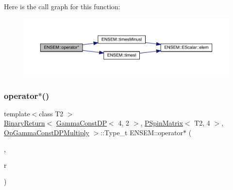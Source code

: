 Here is the call graph for this function\+:\nopagebreak
\begin{figure}[H]
\begin{center}
\leavevmode
\includegraphics[width=350pt]{d6/df5/group__primspinmatrix_gaa16aa59946d908b7254dc099e2518fc0_cgraph}
\end{center}
\end{figure}
\mbox{\label{group__primspinmatrix_gaa8e0559c55ac9cff30b9407943afea03}} 
\subsubsection{\texorpdfstring{operator$\ast$()}{operator*()}\hspace{0.1cm}{\footnotesize\ttfamily [35/64]}}
{\footnotesize\ttfamily template$<$class T2 $>$ \\
\mbox{\hyperlink{structENSEM_1_1BinaryReturn}{Binary\+Return}}$<$ \mbox{\hyperlink{classENSEM_1_1GammaConstDP}{Gamma\+Const\+DP}}$<$ 4, 2 $>$, \mbox{\hyperlink{classENSEM_1_1PSpinMatrix}{P\+Spin\+Matrix}}$<$ T2, 4 $>$, \mbox{\hyperlink{structENSEM_1_1OpGammaConstDPMultiply}{Op\+Gamma\+Const\+D\+P\+Multiply}} $>$\+::Type\+\_\+t E\+N\+S\+E\+M\+::operator$\ast$ (\begin{DoxyParamCaption}\item[{const \mbox{\hyperlink{classENSEM_1_1GammaConstDP}{Gamma\+Const\+DP}}$<$ 4, 2 $>$ \&}]{,  }\item[{const \mbox{\hyperlink{classENSEM_1_1PSpinMatrix}{P\+Spin\+Matrix}}$<$ T2, 4 $>$ \&}]{r }\end{DoxyParamCaption})\hspace{0.3cm}{\ttfamily [inline]}}

\mbox{\label{group__primspinmatrix_gae21434001730b61b41c47db91f4a45ba}} 
